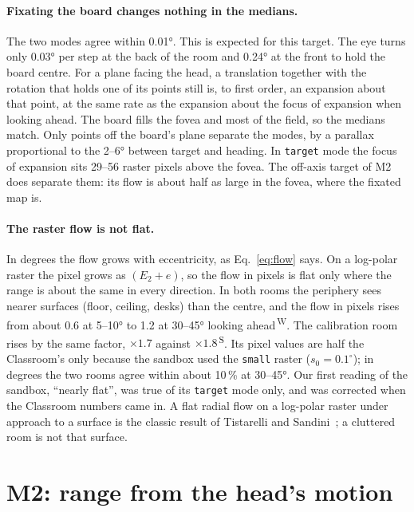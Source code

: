 \documentclass[11pt,a4paper]{article}
\newcommand{\code}[1]{\texttt{\small #1}}
\newcommand{\src}[1]{\textsuperscript{\,#1}}
\newcommand{\WS}{\src{W}}   %
\newcommand{\SB}{\src{S}}   %
\begin{document}
\paragraph{Fixating the board changes nothing in the medians.} The two modes agree within 0.01°. This is expected for this
target. The eye turns only 0.03° per step at the back of the room and 0.24° at the front to hold the board centre. For a
plane facing the head, a translation together with the rotation that holds one of its points still is, to first order,
an expansion about that point, at the same rate as the expansion about the focus of expansion when looking ahead. The
board fills the fovea and most of the field, so the medians match. Only points off the board's plane separate the modes,
by a parallax proportional to the 2--6° between target and heading. In \code{target} mode the focus of expansion sits
29--56 raster pixels above the fovea. The off-axis target of M2 does separate them: its flow is about half as large in
the fovea, where the fixated map is.

\paragraph{The raster flow is not flat.} In degrees the flow grows with eccentricity, as Eq.~\eqref{eq:flow} says. On a
log-polar raster the pixel grows as $(E_2+e)$, so the flow in pixels is flat only where the range is about the same in
every direction. In both rooms the periphery sees nearer surfaces (floor, ceiling, desks) than the centre, and the flow
in pixels rises from about 0.6 at 5--10° to 1.2 at 30--45° looking ahead\WS. The calibration room rises by
the same factor, $\times1.7$ against $\times1.8$\SB. Its pixel values are half the Classroom's only because the sandbox
used the \code{small} raster ($s_0=0.1^\circ$); in degrees the two rooms agree within about 10\,\% at 30--45°. Our first
reading of the sandbox, ``nearly flat'', was true of its \code{target} mode only, and was corrected when the Classroom
numbers came in. A flat radial flow on a log-polar raster under approach to a surface is the classic result of
Tistarelli and Sandini~\cite{tistarelli}; a cluttered room is not that surface.

\section{M2: range from the head's motion}\label{sec:m2}
\end{document}
